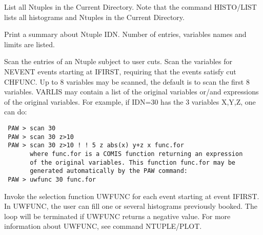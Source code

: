\BEGTEXT
List all Ntuples in the Current Directory.
Note that the command HISTO/LIST lists all histograms and Ntuples
in the Current Directory.
\ENDTEXT

\BEGARG
{}
\ENDARG
\BEGTEXT
Print a summary about Ntuple IDN.
Number of entries, variables names and limits are listed.
\ENDTEXT

\BEGARG
{}
\ENDARG
\BEGTEXT
Scan the entries of an Ntuple subject to user cuts.
Scan the variables for NEVENT events starting at IFIRST, requiring that
the events satisfy cut CHFUNC. Up to 8 variables may be scanned,
the default is to scan the first 8 variables.
VARLIS may contain a list of the original variables or/and expressions
of the original variables.
For example, if IDN=30 has the 3 variables X,Y,Z, one can do:
\begin{verbatim}
 PAW > scan 30
 PAW > scan 30 z>10
 PAW > scan 30 z>10 ! ! 5 z abs(x) y+z x func.for
       where func.for is a COMIS function returning an expression
       of the original variables. This function func.for may be
       generated automatically by the PAW command:
 PAW > uwfunc 30 func.for
\end{verbatim}
\ENDTEXT

\BEGARG
{}
\ENDARG
\BEGTEXT
Invoke the selection function UWFUNC for each event
starting at event IFIRST. In UWFUNC, the user can fill one or several
histograms previously booked.
The loop will be terminated if UWFUNC returns a negative value.
For more information about UWFUNC, see command NTUPLE/PLOT.
\ENDTEXT

